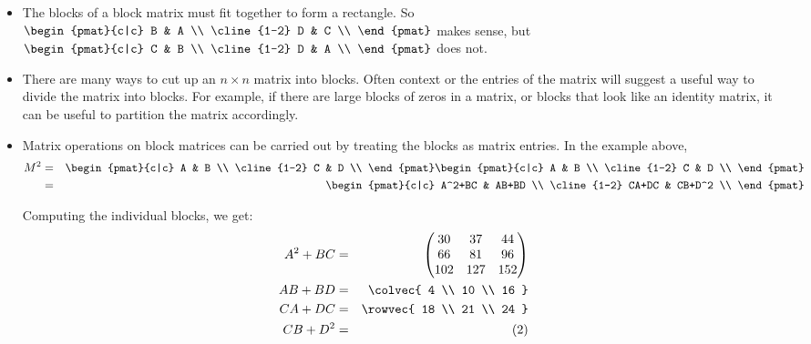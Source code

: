 \begin{itemize}
\item The blocks of a block matrix  must fit together to form a rectangle.  So 
$\begin{pmat}{c|c}
B & A \\
\cline{1-2}
D & C \\
\end{pmat}
$ makes sense, but 
$\begin{pmat}{c|c}
C & B \\
\cline{1-2}
D & A \\
\end{pmat}
$ does not.


\item There are many ways to cut up an $n\times n$ matrix into blocks.  Often context or the entries of the matrix will suggest a useful way to divide the matrix into blocks.  For example, if there are large blocks of zeros in a matrix, or blocks that look like an identity matrix, it can be useful to partition the matrix accordingly.

\item Matrix operations on block matrices can be carried out by treating the blocks as matrix entries.  In the example above,
\begin{eqnarray*}
M^2 & = & \begin{pmat}{c|c}
A & B \\
\cline{1-2}
C & D \\
\end{pmat}
\begin{pmat}{c|c}
A & B \\
\cline{1-2}
C & D \\
\end{pmat} \\
& = & \begin{pmat}{c|c}
A^2+BC & AB+BD \\
\cline{1-2}
CA+DC & CB+D^2 \\
\end{pmat} \\
\end{eqnarray*}

Computing the individual blocks, we get:
\begin{eqnarray*}
A^2+BC &=& \begin{pmatrix}
	30 & 37 & 44 \\
	66 & 81 & 96 \\
	102&127 &152 \\
	\end{pmatrix} \\
AB+BD  &=& \colvec{ 4 \\ 10 \\ 16 } \\
CA+DC  &=& \rowvec{ 18 \\ 21 \\ 24 } \\
CB+D^2 &=& (2) 
\end{eqnarray*}


\end{itemize}
